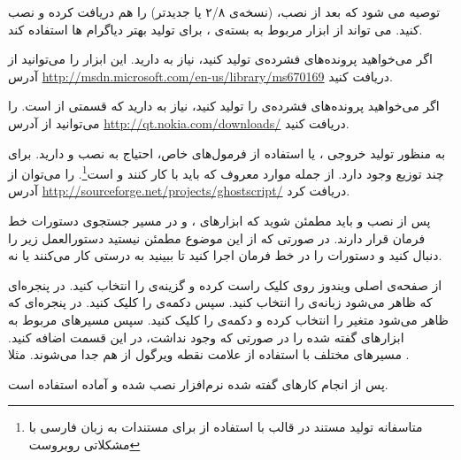 توصیه می شود که بعد از نصب،
(نسخه‌ی ۲/۸ یا جدیدتر) را هم دریافت کرده و نصب کنید.
 می تواند از ابزار
 مربوط به بسته‌ی
، برای تولید بهتر دیاگرام ها استفاده کند.

اگر می‌خواهید پرونده‌های فشرده‌ی  تولید کنید، نیاز به 
دارید. این ابزار را می‌توانید از آدرس 
\url{http://msdn.microsoft.com/en-us/library/ms670169}
 دریافت کنید.

اگر می‌خواهید پرونده‌های فشرده‌ی  را تولید کنید، نیاز به  دارید که قسمتی از  
 است.  را می‌توانید از آدرس 
\url{http://qt.nokia.com/downloads/}
دریافت کنید.

به منظور تولید خروجی ، یا استفاده از فرمول‌های خاص، احتیاج به نصب
 و  دارید.
برای  چند توزیع وجود دارد. از جمله موارد معروف که باید با 
کار کنند  و  است\footnote{متاسفانه تولید مستند در قالب
 با استفاده از  برای مستندات به زبان فارسی با مشکلاتی
روبروست}.
 را می‌توان از آدرس
\url{http://sourceforge.net/projects/ghostscript/} 
 دریافت کرد.

پس از نصب  و  باید مطمئن شوید که ابزارهای
،  و  در مسیر جستجوی دستورات خط
فرمان قرار دارند. در صورتی که از این موضوع مطمئن نیستید دستورالعمل زیر را دنبال
کنید و دستورات را در خط فرمان اجرا کنید تا ببینید به درستی کار می‌کنند یا نه.

از صفحه‌ی اصلی ویندوز روی  کلیک راست کرده و گزینه‌ی
 را انتخاب کنید.
 در پنجره‌ای که ظاهر می‌شود زبانه‌ی  را انتخاب کنید. سپس دکمه‌ی
  را کلیک کنید.
 در پنجره‌ای که ظاهر می‌شود متغیر  را انتخاب کرده و دکمه‌ی  را
 کلیک کنید.
 سپس مسیرهای مربوط به ابزارهای گفته شده را در صورتی که وجود نداشت، در این قسمت
 اضافه کنید.
 مسیرهای مختلف با استفاده از علامت نقطه ویرگول از هم جدا می‌شوند. مثلا
.

پس از انجام کارهای گفته شده نرم‌افزار  نصب شده و آماده استفاده است.